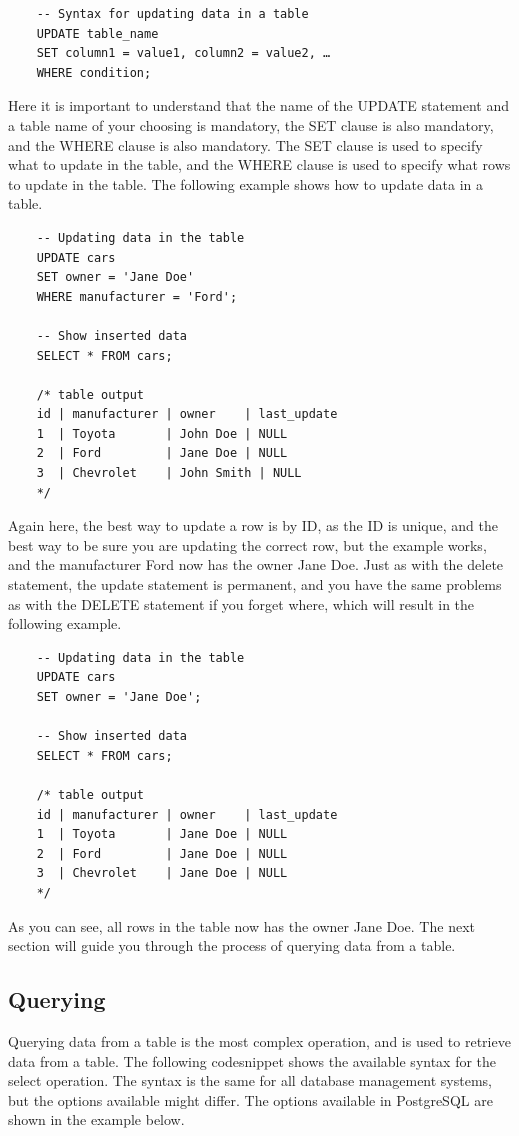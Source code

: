 \begin{verbatim}
    -- Syntax for updating data in a table
    UPDATE table_name
    SET column1 = value1, column2 = value2, …
    WHERE condition;
\end{verbatim}

Here it is important to understand that the name of the UPDATE statement and a table name of your choosing is mandatory, the SET clause is also mandatory, and the WHERE clause is also mandatory. The SET clause is used to specify what to update in the table, and the WHERE clause is used to specify what rows to update in the table. The following example shows how to update data in a table.

\begin{verbatim}
    -- Updating data in the table
    UPDATE cars
    SET owner = 'Jane Doe'
    WHERE manufacturer = 'Ford';

    -- Show inserted data
    SELECT * FROM cars;

    /* table output
    id | manufacturer | owner    | last_update
    1  | Toyota       | John Doe | NULL
    2  | Ford         | Jane Doe | NULL
    3  | Chevrolet    | John Smith | NULL
    */
\end{verbatim}

Again here, the best way to update a row is by ID, as the ID is unique, and the best way to be sure you are updating the correct row, but the example works, and the manufacturer Ford now has the owner Jane Doe. Just as with the delete statement, the update statement is permanent, and you have the same problems as with the DELETE statement if you forget where, which will result in the following example.

\begin{verbatim}
    -- Updating data in the table
    UPDATE cars
    SET owner = 'Jane Doe';

    -- Show inserted data
    SELECT * FROM cars;

    /* table output
    id | manufacturer | owner    | last_update
    1  | Toyota       | Jane Doe | NULL
    2  | Ford         | Jane Doe | NULL
    3  | Chevrolet    | Jane Doe | NULL
    */
\end{verbatim}

As you can see, all rows in the table now has the owner Jane Doe. The next section will guide you through the process of querying data from a table.

\subsection{Querying}
Querying data from a table is the most complex operation, and is used to retrieve data from a table. The following codesnippet shows the available syntax for the select operation. The syntax is the same for all database management systems, but the options available might differ. The options available in PostgreSQL are shown in the example below.

